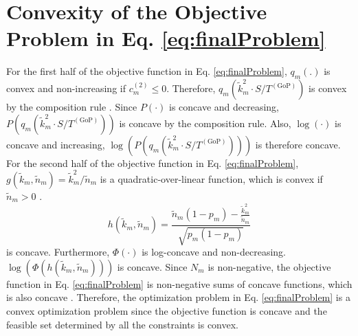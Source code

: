 \documentclass[journal]{IEEEtran}
\begin{document}
\section{Convexity of the Objective Problem in Eq. \eqref{eq:finalProblem}}
For the first half of the objective function in Eq. \eqref{eq:finalProblem}, $q_m\left(.\right)$ is convex and non-increasing if $c_m^{\left(2\right)}\leq 0$. Therefore, $q_m\left(\tilde{k}_m^2\cdot S/T^{\left(\text{GoP}\right)}\right)$ is convex by the composition rule \cite{BoVa04}. Since $P\left(\cdot \right)$ is concave and decreasing, $P\left(q_m\left(\tilde{k}_m^2\cdot S/T^{\left(\text{GoP}\right)}\right)\right)$ is concave by the composition rule. Also, $\log\left(\cdot\right)$ is concave and increasing, $\log\left(P\left(q_m\left(\tilde{k}_m^2\cdot S/T^{\left(\text{GoP}\right)}\right)\right)\right)$ is therefore concave. For the second half of the objective function in Eq. \eqref{eq:finalProblem}, $g\left(\tilde{k}_m,\tilde{n}_m\right)=\tilde{k}^2_m/\tilde{n}_m$ is a quadratic-over-linear function, which is convex if $\tilde{n}_m>0$ \cite{BoVa04}. 
\begin{equation}
h\left(\tilde{k}_m,\tilde{n}_m\right) = \frac{\tilde{n}_m\left(1-p_m\right)-\frac{\tilde{k}_m^2}{\tilde{n}_m}}{\sqrt{p_m\left(1-p_m\right)}}
\end{equation}
is concave. Furthermore, $\Phi\left(\cdot\right)$ is log-concave \cite{BoVa04} and non-decreasing. $\log\left(\Phi\left(h\left(\tilde{k}_m,\tilde{n}_m\right)\right)\right)$ is concave. Since $N_m$ is non-negative, the objective function in Eq. \eqref{eq:finalProblem} is non-negative sums of concave functions, which is also concave \cite{BoVa04}. Therefore, the optimization problem in Eq. \eqref{eq:finalProblem} is a convex optimization problem since the objective function is concave and the feasible set determined by all the constraints is convex.








\end{document}

